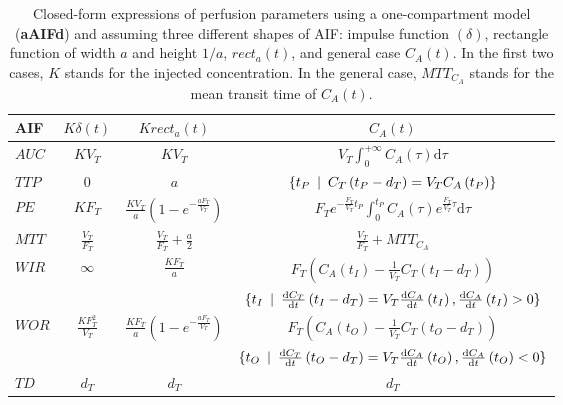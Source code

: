 \begin{table}[!h]
\begin{center}
\begin{tabular}{lccc}
\toprule
AIF & \textbf{$K\delta\left(t\right)$} & $K rect_a\left(t\right)$ & $C_A \left(t\right)$ \\
\midrule
\textbf{$AUC$} & $KV_T$ & $KV_T$ & $V_T \int_{0}^{+\infty}C_A\left(\tau\right)\mathrm d\tau$\\
\midrule
\textbf{$TTP$} & 0  & $a$ & $\{ t_P \enskip\vert\enskip C_T\left(t_P - d_T\right) = V_T C_A\left(t_P \right)\}$ \\
\midrule
\textbf{$PE$} &  $KF_T$ & $\frac{KV_T}{a}\left(1-e^{-\frac{aF_T}{V_T}}\right)$ & $F_Te^{-\frac{F_T}{V_T} t_P}\int_{0}^{t_P}C_A\left(\tau\right)e^{\frac{F_T}{V_T} \tau}\mathrm d\tau$ \\
\midrule
\textbf{$MTT$} & $\frac{V_T}{F_T}$ & $\frac{V_T}{F_T} + \frac{a}{2}$ & $\frac{V_T}{F_T} + MTT_{C_A}$ \\
\midrule
\multirow{2}{*}{\textbf{$WIR$}}
 &  \multirow{2}{*}{$\infty$} & \multirow{2}{*}{{$\frac{KF_T}{a}$}} & $F_T\left(C_A\left(t_{I}\right)-\frac{1}{V_T}C_T\left(t_{I} - d_T\right)\right)$ \\
&  & & $\{ t_{I} \enskip\vert\enskip \frac{\mathrm d C_T}{\mathrm dt}\left(t_{I} - d_T\right) = V_T \frac{\mathrm d C_A}{\mathrm dt}\left(t_{I}\right), \frac{\mathrm d C_A}{\mathrm d t}\left(t_{I}\right) > 0\}$ \\
\midrule
\multirow{2}{*}{$WOR$} &  \multirow{2}{*}{$\frac{KF_T^2}{V_T}$} & \multirow{2}{*}{$\frac{KF_T}{a}\left( 1-e^{-\frac{aF_T}{V_T}} \right)$} & $F_T\left(C_A\left(t_{O}\right)-\frac{1}{V_T}C_T\left(t_{O} - d_T\right)\right)$ \\
& & & $\{ t_{O} \enskip\vert\enskip \frac{\mathrm d C_T}{\mathrm d t}\left(t_{O} - d_T\right) = V_T \frac{\mathrm d C_A}{\mathrm d t}\left(t_{O}\right),\frac{\mathrm d C_A}{\mathrm d t}\left(t_{O}\right) < 0\}$ \\
\midrule
$TD$ & $d_T$ & $d_T$ & $d_T$ \\
\bottomrule
\end{tabular}
\caption{Closed-form expressions of perfusion parameters using a one-compartment model (\textbf{aAIFd}) and assuming three different shapes of AIF: impulse function $(\delta)$, rectangle function of width $a$ and height $1/a$, $rect_a(t)$, and general case $C_A(t)$. In the first two cases, $K$ stands for the injected concentration. In the general case, $MTT_{C_A}$ stands for the mean transit time of $C_A(t)$.}
\label{tab:AnalyticRelationAIF}
\end{center}
\end{table}

